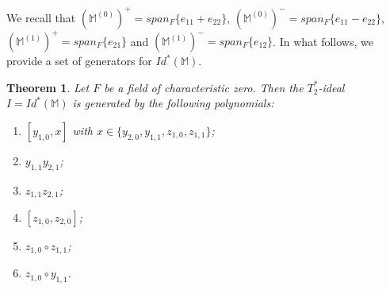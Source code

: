 \documentclass[11pt]{amsart}
\newtheorem{theorem}{Theorem}[section]
\theoremstyle{definition}
\theoremstyle{remark}
\begin{document}
	We recall that $(\mathbb M^{(0)})^+=span_F\{e_{11}+e_{22}\}$, $(\mathbb M^{(0)})^-=span_F\{e_{11}-e_{22}\}$, $(\mathbb M^{(1)})^+=span_F\{e_{21}\}$ and $(\mathbb M^{(1)})^-=span_F\{e_{12}\}$. In what follows, we provide a set of generators for $Id^*(\mathbb M)$. 
	
	
	\begin{theorem}\label{thm:main}
		Let $F$ be a field of characteristic zero. Then the $T_2^*$-ideal $I=Id^*(\mathbb M)$ is generated by the following polynomials:
		\begin{enumerate}
			\item $[y_{1, 0}, x]$ with $x\in \{y_{2,0},
			y_{1, 1}, z_{1, 0}, z_{1, 1}\}$;
			\item $y_{1, 1}y_{2, 1}$;
			\item $z_{1, 1}z_{2, 1}$;
			\item $[z_{1, 0}, z_{2, 0}]$;
			\item $z_{1, 0}\circ z_{1, 1}$;
			\item $z_{1, 0}\circ y_{1, 1}$.
		\end{enumerate}
	\end{theorem}
	
\end{document}

